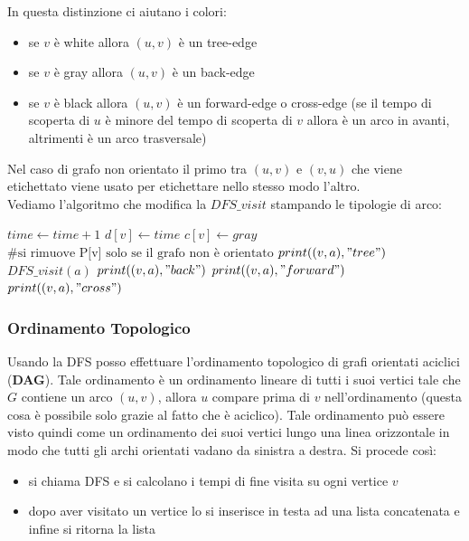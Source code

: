 \documentclass[a4paper,12pt, oneside]{book}
\begin{document}
In questa distinzione ci aiutano i colori:
\begin{itemize}
  \item se $v$ è white allora $(u, v)$ è un tree-edge
  \item se $v$ è gray allora $(u, v)$ è un back-edge
  \item se $v$ è black allora $(u, v)$ è un forward-edge o cross-edge
  (se il tempo di scoperta di $u$ è minore del tempo di scoperta di
  $v$ allora è un arco in avanti, altrimenti è un arco trasversale)
\end{itemize}
Nel caso di grafo non orientato il primo tra $(u,v)$ e $(v,u)$ che
viene etichettato viene usato per etichettare nello stesso modo
l'altro.\\ Vediamo l'algoritmo che modifica la $DFS\_visit$ stampando
le tipologie di arco:
\begin{algorithm}[H]
  \begin{algorithmic}
    \State $time \gets time+1$
    \State $d[v]\gets time$
    \State $c[v]\gets gray$
    \State $\mbox{\#si rimuove P[v] solo se il grafo non è orientato}$
    \State $print((v,a), "tree")$
    \State $DFS\_visit(a)$
    \State $print((v,a), "back")$
    \State $print((v,a), "forward")$
    \Else
    \State $print((v,a), "cross")$
    \EndIf
    \EndIf
    \EndFor
    \EndFunction
  \end{algorithmic}
\end{algorithm}

\subsubsection{Ordinamento Topologico}
Usando la DFS posso effettuare l'ordinamento topologico di grafi
orientati aciclici (\textbf{DAG}). Tale ordinamento è un ordinamento
lineare di tutti i suoi vertici tale che $G$ contiene un arco $(u,v)$,
allora $u$ compare prima di $v$ nell'ordinamento (questa cosa è
possibile solo grazie al fatto che è aciclico). Tale ordinamento può
essere visto quindi come un ordinamento dei suoi vertici lungo una
linea orizzontale in modo che tutti gli archi orientati vadano da
sinistra a destra. Si procede così:
\begin{itemize}
  \item si chiama DFS e si calcolano i tempi di fine visita su ogni
  vertice $v$
  \item dopo aver visitato un vertice lo si inserisce in testa ad una
  lista concatenata e infine si ritorna la lista
\end{itemize}
\end{document}
